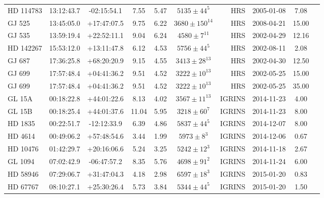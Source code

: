 \begin{scriptsize}
\begin{longtable}{lcccccrccc}
  HD 114783 &   13:12:43.7 &   -02:15:54.1 &   7.55 &  5.47 &     $5135 \pm 44^{5}$ &         HRS &      2005-01-08 &              7.08  \\
     GJ 525 &   13:45:05.0 &   +17:47:07.5 &   9.75 &  6.22 &   $3680 \pm 150^{14}$ &         HRS &      2008-04-21 &             15.00  \\
     GJ 535 &   13:59:19.4 &   +22:52:11.1 &   9.04 &  6.24 &     $4580 \pm 7^{11}$ &         HRS &      2002-04-29 &             12.16  \\
  HD 142267 &   15:53:12.0 &   +13:11:47.8 &   6.12 &  4.53 &     $5756 \pm 44^{5}$ &         HRS &      2002-08-11 &              2.08  \\
     GJ 687 &   17:36:25.8 &   +68:20:20.9 &   9.15 &  4.55 &    $3413 \pm 28^{13}$ &         HRS &      2002-04-30 &             12.50  \\
     GJ 699 &   17:57:48.4 &   +04:41:36.2 &   9.51 &  4.52 &    $3222 \pm 10^{13}$ &         HRS &      2002-05-25 &             15.00  \\
     GJ 699 &   17:57:48.4 &   +04:41:36.2 &   9.51 &  4.52 &    $3222 \pm 10^{13}$ &         HRS &      2002-05-25 &             35.00  \\
     GL 15A &   00:18:22.8 &   +44:01:22.6 &   8.13 &  4.02 &    $3567 \pm 11^{13}$ &      IGRINS &      2014-11-23 &              4.00  \\
     GL 15B &   00:18:25.4 &   +44:01:37.6 &  11.04 &  5.95 &     $3218 \pm 60^{7}$ &      IGRINS &      2014-11-23 &              8.00  \\
     HD 1835 &   00:22:51.7 &   -12:12:33.9 &   6.39 &  4.86 &     $5837 \pm 44^{5}$ &      IGRINS &      2014-12-07 &              8.00  \\
    HD 4614 &   00:49:06.2 &   +57:48:54.6 &   3.44 &  1.99 &      $5973 \pm 8^{3}$ &      IGRINS &      2014-12-06 &              0.67  \\
    HD 10476 &   01:42:29.7 &   +20:16:06.6 &   5.24 &  3.25 &     $5242 \pm 12^{3}$ &      IGRINS &      2014-11-18 &              2.67  \\
    GL 1094 &   07:02:42.9 &   -06:47:57.2 &   8.35 &  5.76 &     $4698 \pm 91^{2}$ &      IGRINS &      2014-11-24 &              6.00  \\
    HD 58946 &   07:29:06.7 &   +31:47:04.3 &   4.18 &  2.98 &     $6597 \pm 18^{3}$ &      IGRINS &      2015-01-20 &              0.83  \\
    HD 67767 &   08:10:27.1 &   +25:30:26.4 &   5.73 &  3.84 &     $5344 \pm 44^{5}$ &      IGRINS &      2015-01-20 &              1.50  \\

\end{longtable}
\end{scriptsize}
